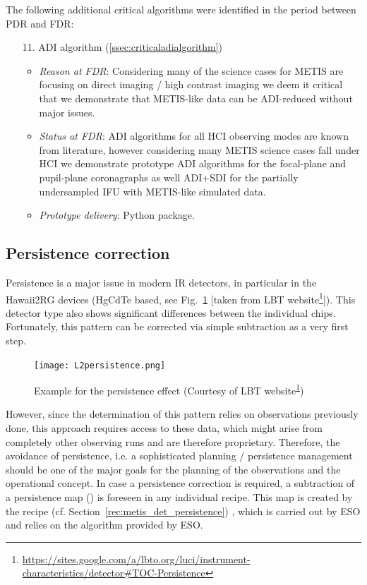 The following additional critical algorithms were identified in the period between PDR and FDR:

\begin{enumerate}
    \item[11.] ADI algorithm (\ref{ssec:criticaladialgorithm})
    \begin{itemize}
        \item \textit{Reason at FDR}: Considering many of the science cases for METIS are focusing on direct imaging / high contrast imaging we deem it critical that we demonstrate that METIS-like data can be ADI-reduced without major issues.
        \item \textit{Status at FDR}: ADI algorithms for all HCI observing modes are known from literature, however considering many METIS science cases fall under HCI we demonstrate prototype ADI algorithms for the focal-plane and pupil-plane coronagraphs as well ADI+SDI for the partially undersampled \ac{IFU} with METIS-like simulated data.
        \item \textit{Prototype delivery}: Python package.
    \end{itemize}
\end{enumerate}

\subsection{Persistence correction}
\label{ssec:criticalpersistencecorrection}
\label{sec_persistence_correction}
Persistence is a major issue in modern IR detectors, in particular in the Hawaii2RG devices (HgCdTe based, see Fig.~\ref{fig:h2rg_persistence} [taken from LBT website\footnote{\url{https://sites.google.com/a/lbto.org/luci/instrument-characteristics/detector\#TOC-Persistence}\label{fn:persistence}}]).
This detector type also shows significant differences between the individual chips.
Fortunately, this pattern can be corrected via simple subtraction as a very first step.

\begin{figure}[ht]
  \centering
  \texttt{[image: L2persistence.png]}
  \caption[Persistence example]{Example for the persistence effect (Courtesy
    of LBT website\textsuperscript{\ref{fn:persistence}})}
  \label{fig:h2rg_persistence}
\end{figure}

However, since the determination of this pattern relies on observations previously done, this approach requires access to these data, which might arise from completely other observing runs and are therefore proprietary.
Therefore, the avoidance of persistence, i.e. a sophisticated planning / persistence management should be one of the major goals for the planning of the observations and the operational concept.
In case a persistence correction is required, a subtraction of a persistence map (\hyperref[dataitem:persistence_map]{}) is foreseen in any individual recipe. This map is created by the recipe  (cf. Section~\ref{rec:metis_det_persistence}) , which is carried out by \ac{ESO} and relies on the algorithm provided by \ac{ESO}.


